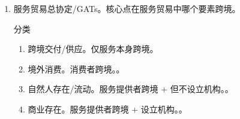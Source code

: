 \begin{enumerate}
\begin{enumerate}
          \item 核心。与货物贸易有关的国民待遇原则和取消数量限制原则。
          \item 4 种禁止性投资措施。
                \begin{enumerate}
                  \item 当地成分要求。。
                  \item 国内销售要求。
                  \item 贸易平衡要求。进 \xyh 出。
                  \item 进口用汇限制/外汇平衡要求。
                \end{enumerate}
        \end{enumerate}
  \item 服务贸易总协定/GATs。核心点在服务贸易中哪个要素跨境。
        \begin{kk}{分类}
          \begin{enumerate}
            \item 跨境交付/供应。仅服务本身跨境。
            \item 境外消费。消费者跨境。。
            \item 自然人存在/流动。服务提供者跨境 + 但不设立机构。。
            \item 商业存在。服务提供者跨境 + 设立机构。。
          \end{enumerate}
        \end{kk}


\end{enumerate}
